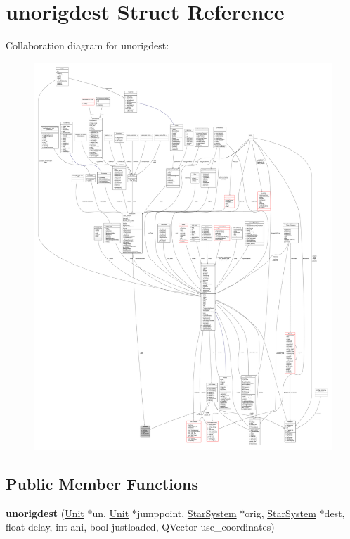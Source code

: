 \hypertarget{structunorigdest}{}\section{unorigdest Struct Reference}
\label{structunorigdest}


Collaboration diagram for unorigdest\+:
\nopagebreak
\begin{figure}[H]
\begin{center}
\leavevmode
\includegraphics[width=350pt]{df/d09/structunorigdest__coll__graph}
\end{center}
\end{figure}
\subsection*{Public Member Functions}
\begin{DoxyCompactItemize}
\item 
{\bfseries unorigdest} (\hyperlink{classUnit}{Unit} $\ast$un, \hyperlink{classUnit}{Unit} $\ast$jumppoint, \hyperlink{classStarSystem}{Star\+System} $\ast$orig, \hyperlink{classStarSystem}{Star\+System} $\ast$dest, float delay, int ani, bool justloaded, Q\+Vector use\+\_\+coordinates)\hypertarget{structunorigdest_a7e4306710218cd89ca19ea2f13da18ab}{}\label{structunorigdest_a7e4306710218cd89ca19ea2f13da18ab}

\end{DoxyCompactItemize}
